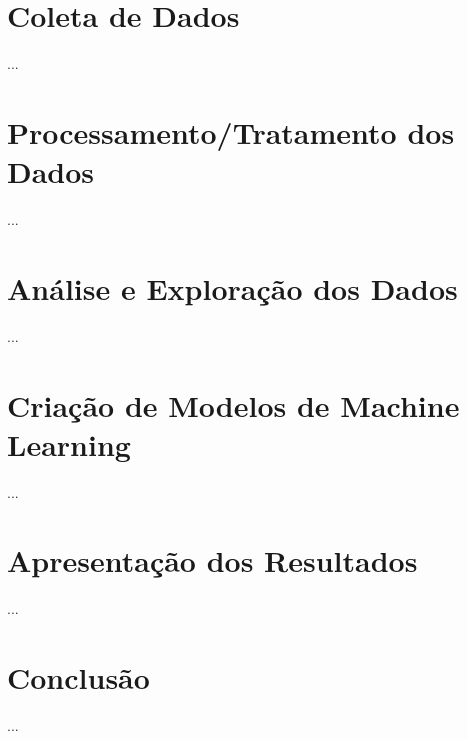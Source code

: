 \documentclass[
	12pt,				
	oneside,
	a4paper,
	english,
	brazil,
	]{abntex2}
\begin{document}

\frenchspacing 

\pretextual

\imprimircapa
\imprimirfolhaderosto*

\listoffigures*
\cleardoublepage

\listoftables*
\cleardoublepage

\tableofcontents*
\cleardoublepage

\textual

\textual



\chapter{Coleta de Dados}
...

\chapter{Processamento/Tratamento dos Dados}
...

\chapter{Análise e Exploração dos Dados}
...

\chapter{Criação de Modelos de Machine Learning}
...

\chapter{Apresentação dos Resultados}
...

\chapter{Conclusão}
...

\postextual


\end{document}
